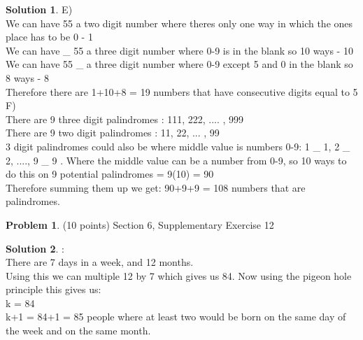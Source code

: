 \documentclass{article}
\theoremstyle{definition}
\newtheorem{problem}{Problem}
\newtheorem*{solution}{Solution}
\begin{document}
\begin{solution}
E)\\
We can have 55 a two digit number where theres only one way in which the ones place has to be 0 - 1
\\
We can have \_ 55 a three digit number where 0-9 is in the blank so 10 ways - 10
\\
We can have 55 \_ a three digit number where 0-9 except 5 and 0 in the blank so 8 ways - 8
\\
Therefore there are 1+10+8 = 19 numbers that have consecutive digits equal to 5
\\

F)\\
There are 9 three digit palindromes : 111, 222, .... , 999
\\
There are 9 two digit palindromes : 11, 22, ... , 99
\\
3 digit palindromes could also be where middle value is numbers 0-9: 1 \_ 1, 2 \_ 2, ...., 9 \_ 9 . Where the middle value can be a number from 0-9, so 10 ways to do this on 9 potential palindromes = 9(10) = 90
\\
Therefore summing them up we get: 90+9+9 = 108 numbers that are palindromes.
\end{solution}

\newpage

\begin{problem} (10 points) Section 6, Supplementary Exercise 12
\end{problem}
\begin{solution}:
\\
There are 7 days in a week, and 12 months.
\\
Using this we can multiple 12 by 7 which gives us 84. Now using the pigeon hole principle this gives us:
\\
k = 84
\\
k+1 = 84+1 = 85 people where at least two would be born on the same day of the week and on the same month.
\end{solution}

\newpage
\end{document}
